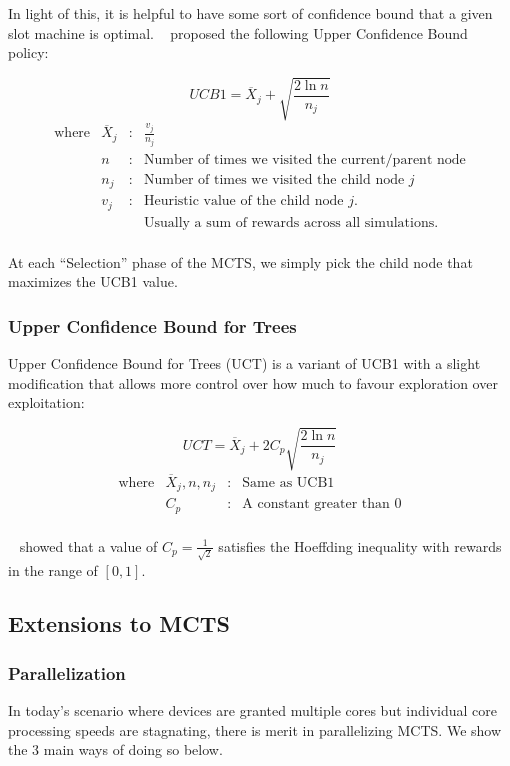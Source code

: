 \documentclass[11pt, a4paper, oneside]{article}
\begin{document}
In light of this, it is helpful to have some sort of confidence bound that a given slot machine is optimal. ~\cite{Auer2002} proposed the following Upper Confidence Bound policy:

$$UCB1 = \overline{X}_j + \sqrt{\frac{2\ln n}{n_j}}$$
$$
\begin{array}{rrcl}
\text{where}  & \overline{X}_j & : & \frac{v_j}{n_j}\\
              & n & : & \text{Number of times we visited the current/parent node}\\
              & n_j & : & \text{Number of times we visited the child node $j$}\\
              & v_j & : & \text{Heuristic value of the child node $j$.}\\
              & & & \text{Usually a sum of rewards across all simulations.}\\
\end{array}
$$

At each ``Selection'' phase of the MCTS, we simply pick the child node that maximizes the UCB1 value.

\subsubsection{Upper Confidence Bound for Trees}
Upper Confidence Bound for Trees (UCT) is a variant of UCB1 with a slight modification that allows more control over how much to favour exploration over exploitation:

$$UCT = \overline{X}_j + 2C_p\sqrt{\frac{2\ln n}{n_j}}$$
$$
\begin{array}{rrcl}
\text{where}  & \overline{X}_j, n, n_j & : & \text{Same as UCB1}\\
              & C_p & : & \text{A constant greater than 0}\\
\end{array}
$$

~\cite{Kocsis} showed that a value of $C_p = \frac{1}{\sqrt{2}}$ satisfies the Hoeffding inequality with rewards in the range of $[0,1]$.

\subsection{Extensions to MCTS}
\subsubsection{Parallelization}
In today's scenario where devices are granted multiple cores but individual core processing speeds are stagnating, there is merit in parallelizing MCTS. We show the 3 main ways of doing so below.
\end{document}
